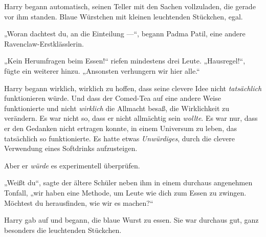 Harry begann automatisch, seinen Teller mit den Sachen vollzuladen, die gerade vor ihm standen. Blaue Würstchen mit kleinen leuchtenden Stückchen, egal.

„Woran dachtest du, an die Einteilung —“, begann Padma Patil, eine andere Ravenclaw-Erstklässlerin.

„Kein Herumfragen beim Essen!“ riefen mindestens drei Leute.
„Hausregel!“, fügte ein weiterer hinzu.
„Ansonsten verhungern wir hier alle.“

Harry begann wirklich, wirklich zu hoffen, dass seine clevere Idee nicht \emph{tatsächlich} funktionieren würde. Und dass der Comed-Tea auf eine andere Weise funktionierte und nicht \emph{wirklich} die Allmacht besaß, die Wirklichkeit zu verändern. Es war nicht so, dass er nicht allmächtig sein \emph{wollte}. Es war nur, dass er den Gedanken nicht ertragen konnte, in einem Universum zu leben, das tatsächlich so funktionierte. Es hatte etwas \emph{Unwürdiges}, durch die clevere Verwendung eines Softdrinks aufzusteigen.

Aber er \emph{würde} es experimentell überprüfen.

„Weißt du“, sagte der ältere Schüler neben ihm in einem durchaus angenehmen Tonfall, „wir haben eine Methode, um Leute wie dich zum Essen zu zwingen. Möchtest du herausfinden, wie wir es machen?“

Harry gab auf und begann, die blaue Wurst zu essen. Sie war durchaus gut, ganz besonders die leuchtenden Stückchen.

